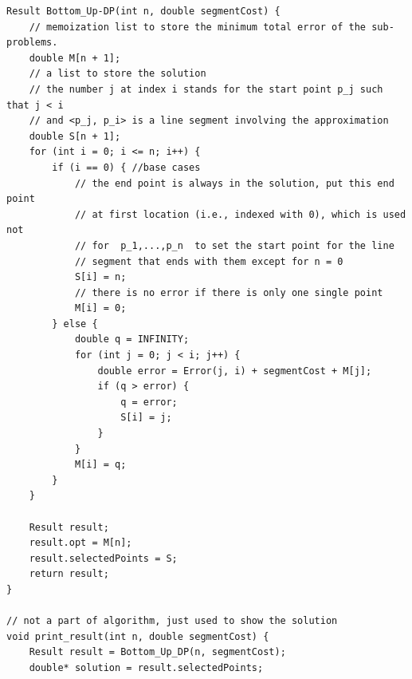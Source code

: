 \documentclass[10pt]{article}
\begin{document}
\begin{enumerate}
\begin{mdframed}
\begin{lstlisting}
Result Bottom_Up-DP(int n, double segmentCost) {
    // memoization list to store the minimum total error of the sub-problems.
    double M[n + 1];
    // a list to store the solution
    // the number j at index i stands for the start point p_j such that j < i
    // and <p_j, p_i> is a line segment involving the approximation
    double S[n + 1];
    for (int i = 0; i <= n; i++) {
        if (i == 0) { //base cases
            // the end point is always in the solution, put this end point
            // at first location (i.e., indexed with 0), which is used not 
            // for  p_1,...,p_n  to set the start point for the line
            // segment that ends with them except for n = 0
            S[i] = n;
            // there is no error if there is only one single point
            M[i] = 0;
        } else {
            double q = INFINITY;
            for (int j = 0; j < i; j++) {
                double error = Error(j, i) + segmentCost + M[j];
                if (q > error) {
                    q = error;
                    S[i] = j;
                }
            }
            M[i] = q;
        }
    }
    
    Result result;
    result.opt = M[n];
    result.selectedPoints = S;
    return result;
}

// not a part of algorithm, just used to show the solution
void print_result(int n, double segmentCost) {
    Result result = Bottom_Up_DP(n, segmentCost);
    double* solution = result.selectedPoints;
    

\end{lstlisting}
\end{mdframed}
\end{enumerate}
\end{document}
